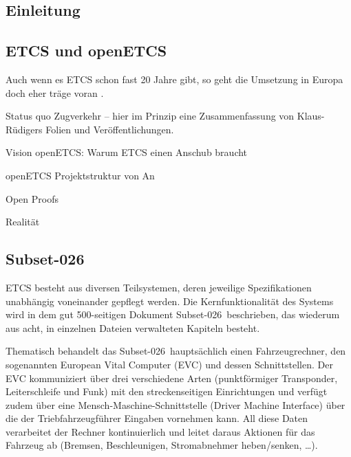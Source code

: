 \documentclass[twoside]{article}
\begin{document}
\begin{multicols}{2}
\noindent 

\section{Einleitung}

\lipsum[2]

\subsection{ETCS und openETCS}

Auch wenn es ETCS schon fast 20 Jahre gibt, so geht die Umsetzung in Europa doch eher träge voran \cite{traege_umsetzung}.

Status quo Zugverkehr – hier im Prinzip eine Zusammenfassung von Klaus-Rüdigers Folien und Veröffentlichungen.

Vision openETCS: Warum ETCS einen Anschub braucht

openETCS Projektstruktur von An

Open Proofs

Realität

\subsection{Subset-026}

ETCS besteht aus diversen Teilsystemen, deren jeweilige Spezifikationen unabhängig voneinander gepflegt werden. Die Kernfunktionalität des Systems wird in dem gut 500-seitigen Dokument \glqq Subset-026\grqq\ beschrieben, das wiederum aus acht, in einzelnen Dateien verwalteten Kapiteln besteht.

Thematisch behandelt das \glqq Subset-026\grqq\ hauptsächlich einen Fahrzeugrechner, den sogenannten European Vital Computer (EVC) und dessen Schnittstellen. Der EVC kommuniziert über drei verschiedene Arten (punktförmiger Transponder, Leiterschleife und Funk) mit den streckenseitigen Einrichtungen und verfügt zudem über eine Mensch-Maschine-Schnittstelle (Driver Machine Interface) über die der Triebfahrzeugführer Eingaben vornehmen kann. All diese Daten verarbeitet der Rechner kontinuierlich und leitet daraus Aktionen für das Fahrzeug ab (Bremsen, Beschleunigen, Stromabnehmer heben/senken, \ldots ).


\end{multicols}
\end{document}
